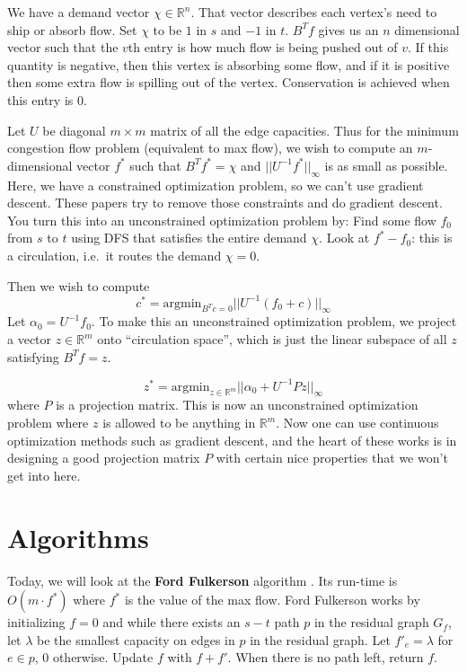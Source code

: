 \documentclass[11pt]{article}
\newcommand{\R}{\mathbb{R}}
\begin{document}
We have a demand vector $\chi \in \mathbb{R}^{n}$. That vector describes each vertex's need to ship or absorb flow. Set $\chi$ to be $1$ in $s$ and $-1$ in $t$. $B^T f$ gives us an $n$ dimensional vector such that the $v$th entry is how much flow is being pushed out of $v$. If this quantity is negative, then this vertex is absorbing some flow, and if it is positive then some extra flow is spilling out of the vertex. Conservation is achieved when this entry is 0. 

Let $U$ be diagonal $m \times m$ matrix of all the edge capacities. Thus for the minimum congestion flow problem (equivalent to max flow), we wish to compute an $m$-dimensional vector $f^*$ such that $B^T f^* = \chi$ and $|| U^{-1} f^* ||_\infty$ is as small as possible. Here, we have a constrained optimization problem, so we can't use gradient descent. These papers try to remove those constraints and do gradient descent. You turn this into an unconstrained optimization problem by: Find some flow $f_0$ from $s$ to $t$ using DFS that satisfies the entire demand $\chi$. Look at $f^* - f_0$: this is a circulation, i.e.\ it routes the demand $\chi = 0$.

Then we wish to compute $$c^* = \text{argmin}_{B^T c = 0} || U^{-1} (f_0 + c) ||_\infty $$
Let $\alpha_0 = U^{-1} f_0$. To make this an unconstrained optimization problem, we project a vector $z\in\R^m$ onto ``circulation space'', which is just the linear subspace of all $z$ satisfying $B^{T} f = z$.  

$$z^* = \text{argmin}_{z \in \mathbb{R}^{m}} || \alpha_0 + U^{-1} P z||_\infty$$ where $P$ is a projection matrix. This is now an unconstrained optimization problem where $z$ is allowed to be anything in $\mathbb{R}^m$. Now one can use continuous optimization methods such as gradient descent, and the heart of these works is in designing a good projection matrix $P$ with certain nice properties that we won't get into here.

\section{Algorithms}

Today, we will look at the \textbf{Ford Fulkerson} algorithm \cite{Ford}. Its run-time is $O(m \cdot f^*)$ where $f^*$ is the value of the max flow. Ford Fulkerson works by initializing $f = 0$ and while there exists an $s-t$ path $p$ in the residual graph $G_f$, let $\lambda$ be the smallest capacity on edges in $p$ in the residual graph. Let $f'_e = \lambda $ for $e \in p$, $0$ otherwise. Update $f$ with $f + f'$. When there is no path left, return $f$. 
\end{document}

